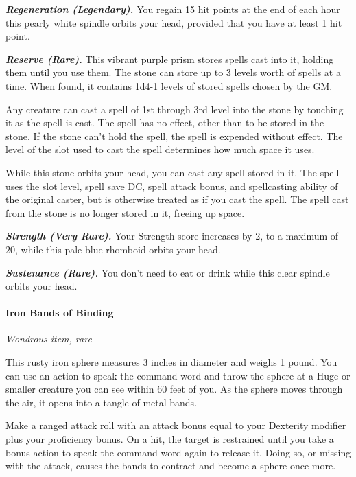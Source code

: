 \documentclass[
]{article}
\begin{document}
\emph{\textbf{Regeneration (Legendary).}} You regain 15 hit points at
the end of each hour this pearly white spindle orbits your head,
provided that you have at least 1 hit point.

\emph{\textbf{Reserve (Rare).}} This vibrant purple prism stores spells
cast into it, holding them until you use them. The stone can store up to
3 levels worth of spells at a time. When found, it contains 1d4-1 levels
of stored spells chosen by the GM.

Any creature can cast a spell of 1st through 3rd level into the stone by
touching it as the spell is cast. The spell has no effect, other than to
be stored in the stone. If the stone can't hold the spell, the spell is
expended without effect. The level of the slot used to cast the spell
determines how much space it uses.

While this stone orbits your head, you can cast any spell stored in it.
The spell uses the slot level, spell save DC, spell attack bonus, and
spellcasting ability of the original caster, but is otherwise treated as
if you cast the spell. The spell cast from the stone is no longer stored
in it, freeing up space.

\emph{\textbf{Strength (Very Rare).}} Your Strength score increases by
2, to a maximum of 20, while this pale blue rhomboid orbits your head.

\emph{\textbf{Sustenance (Rare).}} You don't need to eat or drink while
this clear spindle orbits your head.

\hypertarget{iron-bands-of-binding}{%
\paragraph{Iron Bands of Binding}\label{iron-bands-of-binding}}

\emph{Wondrous item, rare}

This rusty iron sphere measures 3 inches in diameter and weighs 1 pound.
You can use an action to speak the command word and throw the sphere at
a Huge or smaller creature you can see within 60 feet of you. As the
sphere moves through the air, it opens into a tangle of metal bands.

Make a ranged attack roll with an attack bonus equal to your Dexterity
modifier plus your proficiency bonus. On a hit, the target is restrained
until you take a bonus action to speak the command word again to release
it. Doing so, or missing with the attack, causes the bands to contract
and become a sphere once more.
\end{document}
